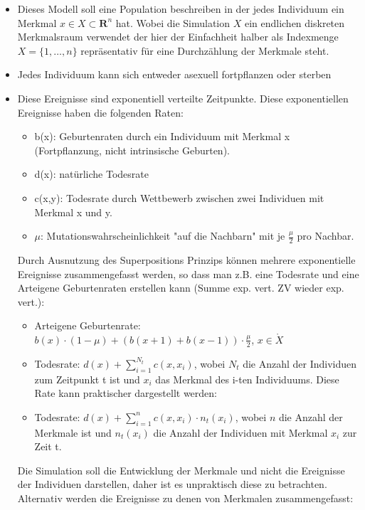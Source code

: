 \documentclass{article}
\begin{document}
		\begin{itemize}
			\item Dieses Modell soll eine Population beschreiben in der jedes Individuum ein Merkmal $ x \in X \subset \mathbf{R}^n $ hat. Wobei die Simulation $ X $ ein endlichen diskreten Merkmalsraum verwendet der hier der Einfachheit halber als Indexmenge $ X = \{1,\dots, n\} $ repräsentativ für eine Durchzählung der Merkmale steht.
			\item Jedes Individuum kann sich entweder asexuell fortpflanzen oder sterben
			\item Diese Ereignisse sind exponentiell verteilte Zeitpunkte. Diese exponentiellen Ereignisse haben die folgenden Raten:
			\begin{itemize}
				\item b(x): Geburtenraten durch ein Individuum mit Merkmal x (Fortpflanzung, nicht intrinsische Geburten).
				\item d(x): natürliche Todesrate
				\item c(x,y): Todesrate durch Wettbewerb zwischen zwei Individuen mit Merkmal x und y.
				\item $ \mu $: Mutationswahrscheinlichkeit "{}auf die Nachbarn"{} mit je $ \frac{\mu}{2} $ pro Nachbar. 
			\end{itemize}
			Durch Ausnutzung des Superpositions Prinzips  können mehrere exponentielle Ereignisse zusammengefasst werden, so dass man z.B. eine Todesrate und eine Arteigene Geburtenraten erstellen kann (Summe exp. vert. ZV wieder exp. vert.):
			\begin{itemize}
			 	\item Arteigene Geburtenrate: $ b(x) \cdot (1 - \mu) + (b(x+1) + b(x-1)) \cdot \frac{\mu}{2}$, $ x \in \mathring{X} $
			 	\item Todesrate: $ d(x) + \sum_{i=1}^{N_t} c(x,x_i) $, wobei $ N_t $ die Anzahl der Individuen zum Zeitpunkt t ist und $ x_i $ das Merkmal des i-ten Individuums. Diese Rate kann praktischer dargestellt werden:
			 	\item Todesrate: $ d(x) + \sum_{i=1}^{n} c(x,x_i) \cdot n_t(x_i) $, wobei $ n $ die Anzahl der Merkmale ist und $ n_t(x_i) $ die Anzahl der Individuen mit Merkmal $ x_i $ zur Zeit t.
			\end{itemize}
			Die Simulation soll die Entwicklung der Merkmale und nicht die Ereignisse der Individuen darstellen, daher ist es unpraktisch diese zu betrachten. Alternativ werden die Ereignisse zu denen von Merkmalen zusammengefasst:
			\begin{itemize}

\end{itemize}
\end{itemize}
\end{document}
